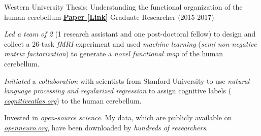 \begin{cventries}
  \cventry
    {Western University} %
    {Thesis: Understanding the functional organization of the human cerebellum}
    {\href{http://ivrylab.berkeley.edu/uploads/4/1/1/5/41152143/functional_boundaries_in_the_human_cerebellum.pdf}{\textbf{Paper [Link]}}}
    {Graduate Researcher (2015-2017)} %
    {
      \begin{cvitems} %
      	\item {\textit{Led a team of 2} (1 research assistant and one post-doctoral fellow) to design and collect a 26-task \textit{fMRI} experiment and used \textit{machine learning} (\textit{semi non-negative matrix factorization}) to generate a \textit{novel functional map} of the human cerebellum.}
      	\item {\textit{Initiated} a \textit{collaboration} with scientists from Stanford University to use \textit{natural language processing and regularized regression} to assign cognitive labels ( {\href{https://cognitiveatlas.org/}{\textit{cognitiveatlas.org}}}) to the human cerebellum.}
      	\item {Invested in \textit{open-source science}. My data, which are publicly available on {\href{https://openneuro.org/datasets/ds002105/versions/1.1.0}{\textit{openneuro.org}}}, have been downloaded by \textit{hundreds of researchers}.}
      \end{cvitems}
    }
\end{cventries}
